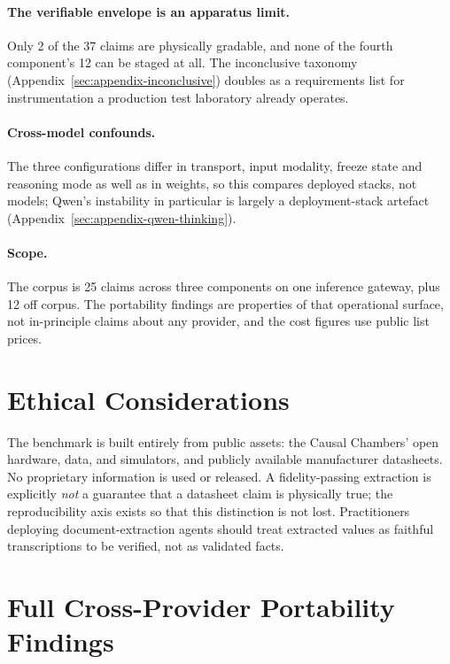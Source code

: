 \documentclass[11pt]{article}
\begin{document}
\paragraph{The verifiable envelope is an apparatus limit.}
Only 2 of the 37 claims are physically gradable, and none of the fourth
component's 12 can be staged at all. The inconclusive taxonomy
(Appendix~\ref{sec:appendix-inconclusive}) doubles as a requirements
list for instrumentation a production test laboratory already operates.

\paragraph{Cross-model confounds.}
The three configurations differ in transport, input modality, freeze
state and reasoning mode as well as in weights, so this compares
deployed stacks, not models; Qwen's instability in particular is largely
a deployment-stack artefact (Appendix~\ref{sec:appendix-qwen-thinking}).

\paragraph{Scope.}
The corpus is 25 claims across three components on one inference
gateway, plus 12 off corpus. The portability findings are properties of that
operational surface, not in-principle claims about any provider, and the
cost figures use public list prices.

\section*{Ethical Considerations}
The benchmark is built entirely from public assets: the Causal Chambers'
open hardware, data, and simulators, and publicly available manufacturer
datasheets. No proprietary information is used or released. A
fidelity-passing extraction is explicitly \emph{not} a guarantee that a
datasheet claim is physically true; the reproducibility axis exists so
that this distinction is not lost. Practitioners deploying
document-extraction agents should treat extracted values as faithful
transcriptions to be verified, not as validated facts.



\appendix

\section{Full Cross-Provider Portability Findings}
\label{sec:appendix-portability}
\end{document}
